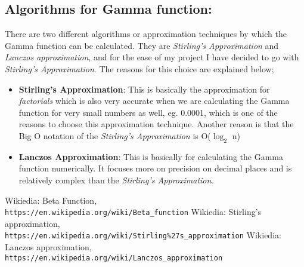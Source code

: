 \documentclass[10pt]{article}
\begin{document}
\subsection{Algorithms for Gamma function:}
There are two different algorithms or approximation techniques by which the Gamma function can be calculated. They are \textit{Stirling's Approximation} and \textit{Lanczos approximation}, and for the ease of my project I have decided to go with \textit{Stirling's Approximation}. The reasons for this choice are explained below;
\begin{itemize}
    \item \textbf{Stirling's Approximation}: This is basically the approximation for \textit{factorials} which is also very accurate when we are calculating the Gamma function for very small numbers as well, eg. 0.0001, which is one of the reasons to choose this approximation technique. Another reason is that the Big O notation of the  \textit{Stirling's Approximation} is O($\log_2$ n)
    
    \item \textbf{Lanczos Approximation}: This is basically for calculating the Gamma function numerically. It focuses more on precision on decimal places and is relatively complex than the \textit{Stirling's Approximation}.
\end{itemize}

\begin{thebibliography}{}

Wikiedia: Beta Function,
\\\texttt{https://en.wikipedia.org/wiki/Beta\_function}
Wikiedia: Stirling's approximation,
\\\texttt{https://en.wikipedia.org/wiki/Stirling\%27s\_approximation}
Wikiedia: Lanczos approximation,
\\\texttt{https://en.wikipedia.org/wiki/Lanczos\_approximation}

\end{thebibliography}
\end{document}
